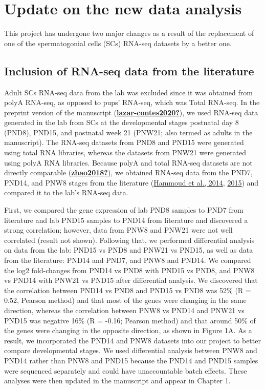 \documentclass[12pt,twoside]{reedthesis}
\begin{document}
\newpage

\hypertarget{update-on-the-new-data-analysis}{%
\section{Update on the new data analysis}\label{update-on-the-new-data-analysis}}

This project has undergone two major changes as a result of the
replacement of one of the spermatogonial cells (SCs) RNA-seq datasets by
a better one.

\hypertarget{inclusion-of-rna-seq-data-from-the-literature}{%
\subsection{Inclusion of RNA-seq data from the literature}\label{inclusion-of-rna-seq-data-from-the-literature}}

Adult SCs RNA-seq data from the lab was excluded since it was obtained
from polyA RNA-seq, as opposed to pups' RNA-seq, which was Total
RNA-seq. In the preprint version of the manuscript (\protect\hyperlink{ref-lazar-contes2020}{\textbf{lazar-contes2020?}}),
we used RNA-seq data generated in the lab from SCs at the developmental
stages postnatal day 8 (PND8), PND15, and postnatal week 21 (PNW21; also
termed as adults in the manuscript). The RNA-seq datasets from PND8 and
PND15 were generated using total RNA libraries, whereas the datasets
from PNW21 were generated using polyA RNA libraries. Because polyA and
total RNA-seq datasets are not directly comparable (\protect\hyperlink{ref-zhao2018}{\textbf{zhao2018?}}), we
obtained RNA-seq data from the PND7, PND14, and PNW8 stages from the
literature (\protect\hyperlink{ref-hammoud2014}{Hammoud et al., 2014}, \protect\hyperlink{ref-hammoud2015}{2015}) and compared it to the lab's
RNA-seq data.

First, we compared the gene expression of lab PND8 samples to PND7 from
literature and lab PND15 samples to PND14 from literature and discovered
a strong correlation; however, data from PNW8 and PNW21 were not well
correlated (result not shown). Following that, we performed differential
analysis on data from the lab: PND15 vs PND8 and PNW21 vs PND15, as well
as data from the literature: PND14 and PND7, and PNW8 and PND14. We
compared the log2 fold-changes from PND14 vs PND8 with PND15 vs PND8,
and PNW8 vs PND14 with PNW21 vs PND15 after differential analysis. We
discovered that the correlation between PND14 vs PND8 and PND15 vs PND8
was 52\% (R = 0.52, Pearson method) and that most of the genes were
changing in the same direction, whereas the correlation between PNW8 vs
PND14 and PNW21 vs PND15 was negative 16\% (R = -0.16; Pearson method)
and that around 50\% of the genes were changing in the opposite
direction, as shown in Figure 1A. As a result, we incorporated the PND14
and PNW8 datasets into our project to better compare developmental
stages. We used differential analysis between PNW8 and PND14 rather than
PNW8 and PND15 because the PND14 and PND15 samples were sequenced
separately and could have unaccountable batch effects. These analyses
were then updated in the manuscript and appear in Chapter 1.
\end{document}
